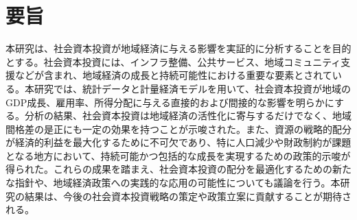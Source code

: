 \chapter*{要旨}

本研究は、社会資本投資が地域経済に与える影響を実証的に分析することを目的とする。社会資本投資には、インフラ整備、公共サービス、地域コミュニティ支援などが含まれ、地域経済の成長と持続可能性における重要な要素とされている。本研究では、統計データと計量経済モデルを用いて、社会資本投資が地域のGDP成長、雇用率、所得分配に与える直接的および間接的な影響を明らかにする。分析の結果、社会資本投資は地域経済の活性化に寄与するだけでなく、地域間格差の是正にも一定の効果を持つことが示唆された。また、資源の戦略的配分が経済的利益を最大化するために不可欠であり、特に人口減少や財政制約が課題となる地方において、持続可能かつ包括的な成長を実現するための政策的示唆が得られた。これらの成果を踏まえ、社会資本投資の配分を最適化するための新たな指針や、地域経済政策への実践的な応用の可能性についても議論を行う。本研究の結果は、今後の社会資本投資戦略の策定や政策立案に貢献することが期待される。

